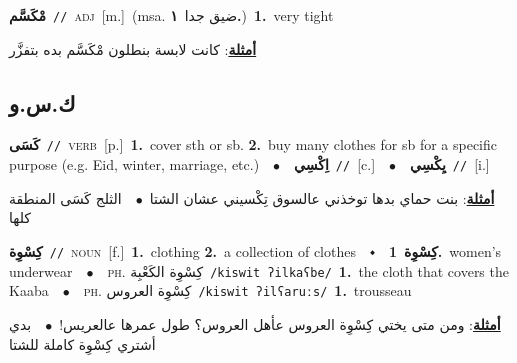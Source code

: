 \documentclass[10pt,a4paper,twoside]{article} %
\begin{document}
\begin{multicols}{2}
{\setlength\topsep{0pt}\textbf{\foreignlanguage{arabic}{مْكَسَّم}}\ {\color{gray}\texttt{//}\color{black}}\ \textsc{adj}\ [m.]\ \color{gray}(msa. \foreignlanguage{arabic}{ضيق جدا}~\foreignlanguage{arabic}{\textbf{١.}})\color{black}\ \textbf{1.}~very tight\  \begin{flushright}\color{gray}\foreignlanguage{arabic}{\textbf{\underline{\foreignlanguage{arabic}{أمثلة}}}: كانت لابسة بنطلون مْكَسَّم بده بتفزَّر}\end{flushright}\color{black}} \vspace{2mm}

\vspace{-3mm}
\subsection*{\color{blue}\foreignlanguage{arabic}{ك.س.و}\color{blue}{}} 

{\setlength\topsep{0pt}\textbf{\foreignlanguage{arabic}{كَسَى}}\ {\color{gray}\texttt{//}\color{black}}\ \textsc{verb}\ [p.]\ \textbf{1.}~cover sth or sb.  \textbf{2.}~buy many clothes for sb for a specific purpose (e.g. Eid, winter, marriage, etc.)\ \ $\bullet$\ \ \setlength\topsep{0pt}\textbf{\foreignlanguage{arabic}{اِكْسِي}}\ {\color{gray}\texttt{//}\color{black}}\ [c.]\ \ $\bullet$\ \ \setlength\topsep{0pt}\textbf{\foreignlanguage{arabic}{يِكْسِي}}\ {\color{gray}\texttt{//}\color{black}}\ [i.]\  \begin{flushright}\color{gray}\foreignlanguage{arabic}{\textbf{\underline{\foreignlanguage{arabic}{أمثلة}}}: بنت حماي بدها توخذني عالسوق تِكْسيني عشان الشتا\ $\bullet$\ \  الثلج كَسَى المنطقة كلها}\end{flushright}\color{black}} \vspace{2mm}

{\setlength\topsep{0pt}\textbf{\foreignlanguage{arabic}{كِسْوِة}}\ {\color{gray}\texttt{//}\color{black}}\ \textsc{noun}\ [f.]\ \textbf{1.}~clothing  \textbf{2.}~a collection of clothes\ \ $\smblkdiamond$\ \ \setlength\topsep{0pt}\textbf{\foreignlanguage{arabic}{كِسْوِة}}\ \textbf{1.}~women's underwear\ \ $\bullet$\ \ \textsc{ph.} \color{gray} \foreignlanguage{arabic}{كِسْوِة الكَعْبِة}\color{black}\ {\color{gray}\texttt{/{\sffamily kiswit ʔilkaʕbe}/}\color{black}}\ \textbf{1.}~the cloth that covers the Kaaba\ \ $\bullet$\ \ \textsc{ph.} \color{gray} \foreignlanguage{arabic}{كِسْوِة العروس}\color{black}\ {\color{gray}\texttt{/{\sffamily kiswit ʔilʕaruːs}/}\color{black}}\ \textbf{1.}~trousseau\  \begin{flushright}\color{gray}\foreignlanguage{arabic}{\textbf{\underline{\foreignlanguage{arabic}{أمثلة}}}: ومن متى يختي كِسْوِة العروس عأهل العروس؟ طول عمرها عالعريس!\ $\bullet$\ \  بدي أشتري كِسْوِة كاملة للشتا}\end{flushright}\color{black}} \vspace{2mm}


\end{multicols}
\end{document}

